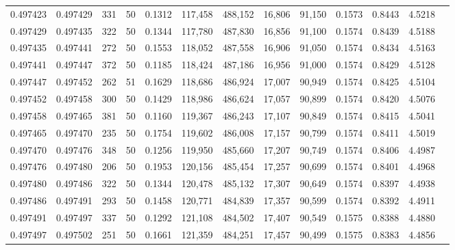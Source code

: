 \begin{tabular}{rrrrrrrrrrrrr}
0.497423 & 0.497429 & 331 &  50 &                                     0.1312 & 117,458 & 488,152 &  16,806 &  91,150 & 0.1573 & 0.8443 & 4.5218 \\
0.497429 & 0.497435 & 322 &  50 &                                     0.1344 & 117,780 & 487,830 &  16,856 &  91,100 & 0.1574 & 0.8439 & 4.5188 \\
0.497435 & 0.497441 & 272 &  50 &                                     0.1553 & 118,052 & 487,558 &  16,906 &  91,050 & 0.1574 & 0.8434 & 4.5163 \\
0.497441 & 0.497447 & 372 &  50 &                                     0.1185 & 118,424 & 487,186 &  16,956 &  91,000 & 0.1574 & 0.8429 & 4.5128 \\
0.497447 & 0.497452 & 262 &  51 &                                     0.1629 & 118,686 & 486,924 &  17,007 &  90,949 & 0.1574 & 0.8425 & 4.5104 \\
0.497452 & 0.497458 & 300 &  50 &                                     0.1429 & 118,986 & 486,624 &  17,057 &  90,899 & 0.1574 & 0.8420 & 4.5076 \\
0.497458 & 0.497465 & 381 &  50 &                                     0.1160 & 119,367 & 486,243 &  17,107 &  90,849 & 0.1574 & 0.8415 & 4.5041 \\
0.497465 & 0.497470 & 235 &  50 &                                     0.1754 & 119,602 & 486,008 &  17,157 &  90,799 & 0.1574 & 0.8411 & 4.5019 \\
0.497470 & 0.497476 & 348 &  50 &                                     0.1256 & 119,950 & 485,660 &  17,207 &  90,749 & 0.1574 & 0.8406 & 4.4987 \\
0.497476 & 0.497480 & 206 &  50 &                                     0.1953 & 120,156 & 485,454 &  17,257 &  90,699 & 0.1574 & 0.8401 & 4.4968 \\
0.497480 & 0.497486 & 322 &  50 &                                     0.1344 & 120,478 & 485,132 &  17,307 &  90,649 & 0.1574 & 0.8397 & 4.4938 \\
0.497486 & 0.497491 & 293 &  50 &                                     0.1458 & 120,771 & 484,839 &  17,357 &  90,599 & 0.1574 & 0.8392 & 4.4911 \\
0.497491 & 0.497497 & 337 &  50 &                                     0.1292 & 121,108 & 484,502 &  17,407 &  90,549 & 0.1575 & 0.8388 & 4.4880 \\
0.497497 & 0.497502 & 251 &  50 &                                     0.1661 & 121,359 & 484,251 &  17,457 &  90,499 & 0.1575 & 0.8383 & 4.4856 \\

\end{tabular}

